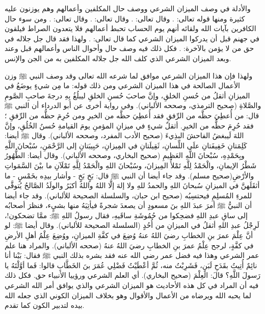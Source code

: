 والأدلة في وصف الميزان الشرعي ووصف حال المكلفين وأعمالهم وهم يوزنون عليه كثيرة ومنها قوله تعالى:
\quranayah*[7][8-9]{\footnotesize \surahname*[7]}. وقال تعالى:
\quranayah*[21][47]{\footnotesize \surahname*[21]}. وقال تعالى:
\quranayah*[23][102-103]{\footnotesize \surahname*[23]}. وقال تعالى:
\quranayah*[101][6-9]{\footnotesize \surahname*[101]}. ومن سوء حال الكافرين بآيات الله ولقائه أنهم يوم الحساب تحبط أعمالهم فلا يتعدون الصراط فيلقون في جهنم قبل أن يدركوا الميزان الشرعي كما قال تعالى: \quranayah*[18][105]{\footnotesize \surahname*[18]}. ولهذا فقد قال جل جلاله في حق من لا يؤمن بالآخرة: \quranayah*[23][74]{\footnotesize \surahname*[23]}. فكل ذلك فيه وصف حال وأحوال الناس وأعمالهم قبل وعند وبعد الميزان الشرعي الذي كلف الله جل جلاله المكلفين به من الجن والإنس. 

ولهذا فإن هذا الميزان الشرعي موافق لما شرعه الله تعالى وقد وصف النبي ﷺ وزن الأعمال الصالحة في هذا الميزان الشرعي ومن ذلك قوله: 
ما مِن شيءٍ يوضَعُ في الميزانِ أثقلُ من حُسنِ الخلقِ، وإنَّ صاحبَ حُسنِ الخلقِ ليبلُغُ بِهِ درجةَ صاحبِ الصَّومِ والصَّلاةِ {\footnotesize (صحيح الترمذي، وصححه الألباني)}. وفي رواية أخرى عن أبو الدرداء أن النبي  ﷺ قال:
من أُعطِيَ حظَّه من الرِّفقِ فقد أُعطِيَ حظَّه من الخيرِ ومن حُرِمَ حظُّه من الرِّفقِ ؛ فقد حُرِمَ حظُّه من الخيرِ. أثقلٌ شيءٍ في ميزانِ المؤمنِ يومَ القيامةِ حُسنُ الخُلُقِ، وإنَّ اللهَ لَيبغضُ الفاحشَ البذِيءَ {\footnotesize (صحيح الأدب المفرد، وصححه الألباني)}. وقال ﷺ أيضا: 
كَلِمَتانِ خَفِيفَتانِ علَى اللِّسانِ، ثَقِيلَتانِ في المِيزانِ، حَبِيبَتانِ إلى الرَّحْمَنِ، سُبْحانَ اللَّهِ وبِحَمْدِهِ، سُبْحانَ اللَّهِ العَظِيمِ {\footnotesize (صحيح البخاري، وصححه الألباني)}. وقال أيضا:
الطُّهُورُ شَطْرُ الإيمانِ، والْحَمْدُ لِلَّهِ تَمْلأُ المِيزانَ، وسُبْحانَ اللهِ والْحَمْدُ لِلَّهِ تَمْلَآنِ ما بيْنَ السَّمَواتِ والأرْضِ{\footnotesize (صحيح مسلم)}.  وقد جاء أيضا أن النبي ﷺ قال: بَخٍ بَخٍ - وأشار بيدِه بخَمْسٍ - ما أثقَلَهنَّ في الميزانِ سُبحانَ اللهِ والحمدُ للهِ ولا إلهَ إلَّا اللهُ واللهُ أكبَرُ والولَدُ الصَّالحُ يُتوفَّى للمرءِ المُسلِمِ فيحتسِبُه {\footnotesize (صحيح ابن حبان، والسلسلة الصحيحة للألباني)}. وقد جاء أيضا أن النبيُّ ﷺ أمرَ عبدَ اللهِ بنَ مسعودٍ أن يصعدَ شجرةً فيأتِيَهُ منها بشيٍء، فنظرَ أصحابُه إلى ساقِ عبدِ اللهِ فضحِكوا من حُمُوشَةِ ساقَيهِ، فقال رسولُ اللهِ ﷺ: ممَّا تضحكون!، لَرِجْلُ عبدِ اللهِ أثقلُ في الميزانِ من أُحُدٍ {\footnotesize (السلسلة الصحيحة للألباني)}. وقال أيضا ﷺ: لو أنَّ عِلْمَ عمرَ بنِ الخطابِ رضيَ اللهُ عنهُ وُضِعَ في كفَّةِ الميزانِ، ووُضِعَ عِلْمُ أهلِ الأرضِ في كفَّةٍ، لرجح عِلْمُ عمرَ بنِ الخطابِ رضيَ اللهُ عنهُ {\footnotesize (صححه الألباني)}. والمراد هنا علم عمر الشرعي وهذا فيه فضل عمر رضي الله عنه فقد بشره بذلك النبي ﷺ فقال: بَيْنا أنا نائِمٌ أُتِيتُ بقَدَحِ لَبَنٍ، فَشَرِبْتُ منه، ثُمَّ أعْطَيْتُ فَضْلِي عُمَرَ بنَ الخَطَّابِ قالوا: فَما أوَّلْتَهُ يا رَسولَ اللَّهِ؟ قالَ: العِلْمَ {\footnotesize (صحيح البخاري)}. أي العلم الشرعي ورؤييا الأنبياء حق. فكل ذلك فيه أن المراد في كل هذه الأحاديث هو الميزان الشرعي والذي يوافق أمر الله الشرعي لما يحبه الله ويرضاه من الأعمال والأقوال وهو بخلاف الميزان الكوني الذي جعله الله بيده لتدبير الكون كما تقدم.

